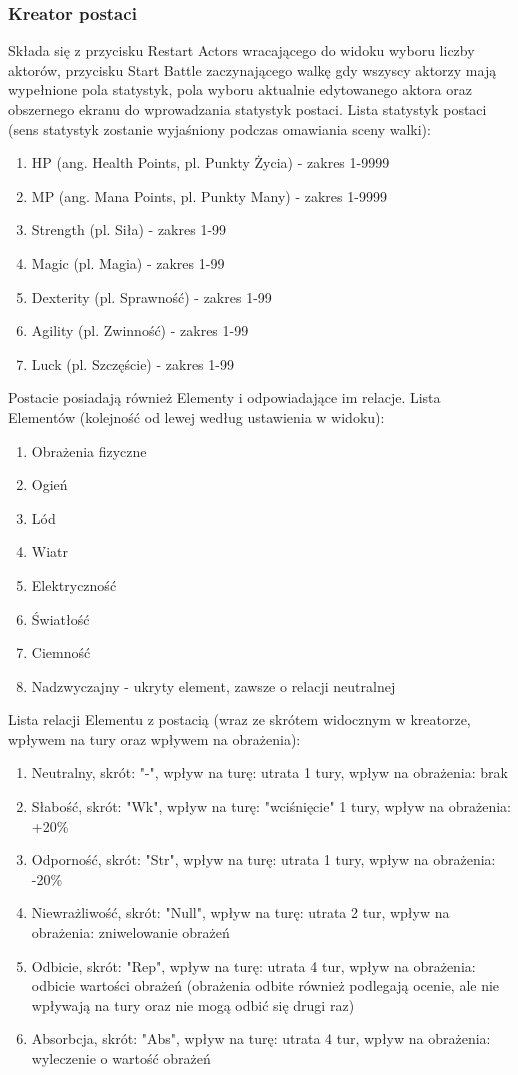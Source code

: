 \documentclass{SGGW-thesis}
\begin{document}
\subsubsection{Kreator postaci}
Składa się z przycisku Restart Actors wracającego do widoku wyboru liczby aktorów, przycisku Start Battle zaczynającego walkę gdy wszyscy aktorzy mają wypełnione pola statystyk, pola wyboru aktualnie edytowanego aktora oraz obszernego ekranu do wprowadzania statystyk postaci.
Lista statystyk postaci (sens statystyk zostanie wyjaśniony podczas omawiania sceny walki):
\begin{enumerate}
  \item{HP (ang. Health Points, pl. Punkty Życia) - zakres 1-9999}
  \item{MP (ang. Mana Points, pl. Punkty Many) - zakres 1-9999}
  \item{Strength (pl. Siła) - zakres 1-99}
  \item{Magic (pl. Magia) - zakres 1-99}
  \item{Dexterity (pl. Sprawność) - zakres 1-99}
  \item{Agility (pl. Zwinność) - zakres 1-99}
  \item{Luck (pl. Szczęście) - zakres 1-99}
\end{enumerate}
\pagebreak
Postacie posiadają również Elementy i odpowiadające im relacje. Lista Elementów (kolejność od lewej według ustawienia w widoku):
\begin{enumerate}
  \item{Obrażenia fizyczne}
  \item{Ogień}
  \item{Lód}
  \item{Wiatr}
  \item{Elektryczność}
  \item{Światłość}
  \item{Ciemność}
  \item{Nadzwyczajny - ukryty element, zawsze o relacji neutralnej}
\end{enumerate}
Lista relacji Elementu z postacią (wraz ze skrótem widocznym w kreatorze, wpływem na tury oraz wpływem na obrażenia):
\begin{enumerate}
  \item{Neutralny, skrót: "-", wpływ na turę: utrata 1 tury, wpływ na obrażenia: brak}
  \item{Słabość, skrót: "Wk", wpływ na turę: "wciśnięcie" 1 tury, wpływ na obrażenia: +20\%}
  \item{Odporność, skrót: "Str", wpływ na turę: utrata 1 tury, wpływ na obrażenia: -20\%}
  \item{Niewrażliwość, skrót: "Null", wpływ na turę: utrata 2 tur, wpływ na obrażenia: zniwelowanie obrażeń}
  \item{Odbicie, skrót: "Rep", wpływ na turę: utrata 4 tur, wpływ na obrażenia: odbicie wartości obrażeń (obrażenia odbite również podlegają ocenie, ale nie wpływają na tury oraz nie mogą odbić się drugi raz)}
  \item{Absorbcja, skrót: "Abs", wpływ na turę: utrata 4 tur, wpływ na obrażenia: wyleczenie o wartość obrażeń}
\end{enumerate}
\end{document}
